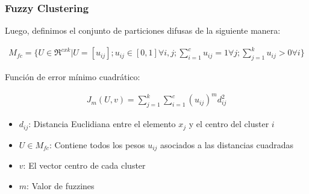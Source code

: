 \begin{frame}
\frametitle{Fuzzy Clustering}

Luego, definimos el conjunto de particiones difusas de la siguiente manera:

\begin{equation}
    \begin{aligned}
        M_{fc} = \{U \in \Re^{cxk} | U = [u_{ij}];u_{ij} \in [0, 1] \forall i, j; \sum_{i=1}^{c} u_{ij} = 1  \forall j; \sum_{j=1}^{k} u_{ij} > 0  \forall i \}
    \end{aligned}
\end{equation}

\pause

Función de error mínimo cuadrático:

\begin{equation}
    \begin{aligned}
        J_m(U, v) = \sum_{j=1}^{k} \sum_{i=1}^{c} (u_{ij})^m d_{ij}^2
    \end{aligned}
\end{equation} 

\begin{itemize}
    \item $d_{ij}$: Distancia Euclidiana entre el elemento $x_j$ y el centro del cluster $i$
    \item $U \in M_{fc}$: Contiene todos los pesos $u_{ij}$ asociados a las distancias cuadradas
    \item $v$: El vector centro de cada cluster
    \item $m$: Valor de fuzzines
\end{itemize}

\end{frame}


